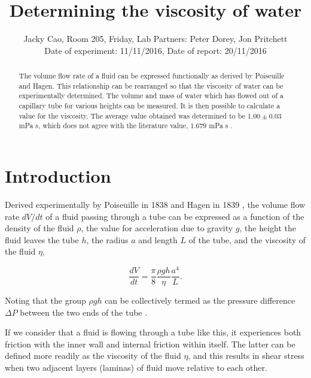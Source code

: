 \documentclass[twocolumn]{revtex4}
\newcommand{\squeezeup}{\vspace{-2.5mm}}
\begin{document}
\textheight=26.385cm

\title{Determining the viscosity of water} 
 
 
\author{Jacky Cao, Room 205, Friday, Lab Partners: Peter Dorey, Jon Pritchett \\ Date of experiment: 11/11/2016, Date of report: 20/11/2016}


\begin{abstract}              
 
The volume flow rate of a fluid can be expressed functionally as derived by Poiseuille and Hagen. This relationship can be rearranged so that the viscosity of water can be experimentally determined. The volume and mass of water which has flowed out of a capillary tube for various heights can be measured. It is then possible to calculate a value for the viscosity. The average value obtained was determined to be $1.00 \pm 0.03$ mPa s, which does not agree with the literature value, $1.679$ mPa s \cite{crc}. 

\end{abstract}

\maketitle

\section{Introduction} 
\vspace{-2ex} 

Derived experimentally by Poiseuille in 1838 and Hagen in 1839 \cite{poiseuillehagen}, the volume flow rate $dV/dt$ of a fluid passing through a tube can be expressed as a function of the density of the fluid $\rho$, the value for acceleration due to gravity $g$, the height the fluid leaves the tube $h$, the radius $a$ and length $L$ of the tube, and the viscosity of the fluid $\eta$,

\squeezeup

\begin{equation} 
\frac{dV}{dt}=\frac{\pi}{8}\frac{\rho gh}{\eta}\frac{a^4}{L}. 
\label{pohagen}
\end{equation}

Noting that the group $\rho gh$ can be collectively termed as the pressure difference $\Delta P$ between the two ends of the tube \cite{collegephysics}. 

If we consider that a fluid is flowing through a tube like this, it experiences both friction with the inner wall and internal friction within itself. The latter can be defined more readily as the viscosity of the fluid $\eta$, and this results in shear stress when two adjacent layers (laminas) of fluid move relative to each other. 
\end{document}
